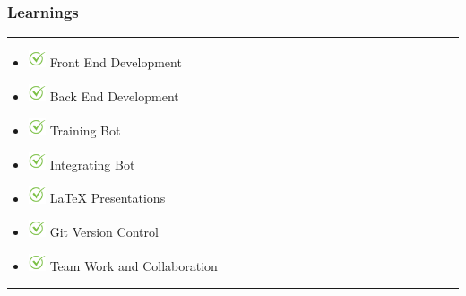 \documentclass[14pt]{beamer}
\begin{document}
\begin{frame}
    \frametitle{Learnings}
    \noindent
    {\color{pink} \rule{\linewidth}{0.7mm} }
    \begin{itemize}
    \item [] \includegraphics[width=0.2in, height=0.2in]{./logos/check.png} Front End Development \\
        \pause
    \item [] \includegraphics[width=0.2in, height=0.2in]{./logos/check.png} Back End Development \\
        \pause
    \item [] \includegraphics[width=0.2in, height=0.2in]{./logos/check.png} Training Bot \\
        \pause
    \item [] \includegraphics[width=0.2in, height=0.2in]{./logos/check.png} Integrating Bot\\
        \pause
   \item [] \includegraphics[width=0.2in, height=0.2in]{./logos/check.png} LaTeX Presentations \\
       \pause
   \item [] \includegraphics[width=0.2in, height=0.2in]{./logos/check.png} Git Version Control \\
       \pause
   \item [] \includegraphics[width=0.2in, height=0.2in]{./logos/check.png} Team Work and Collaboration\\
\end{itemize}
\noindent
    {\color{pink} \rule{\linewidth}{0.7mm} }
\end{frame}
\end{document}
